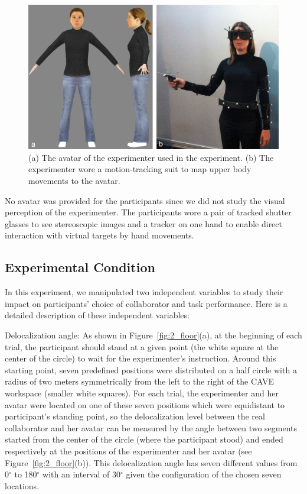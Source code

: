 \begin{figure}[tb]
  \centering
  \includegraphics[width=\textwidth]{figures/2_avatar_photo}
  \caption{\label{fig:2_avatar}(a) The avatar of the experimenter used in the experiment. (b) The experimenter wore a motion-tracking suit to map upper body movements to the avatar.}
\end{figure}

No avatar was provided for the participants since we did not study the visual perception of the experimenter. The participants wore a pair of tracked shutter glasses to see stereoscopic images and a tracker on one hand to enable direct interaction with virtual targets by hand movements.

\subsection{Experimental Condition}
In this experiment, we manipulated two independent variables to study their impact on participants' choice of collaborator and task performance. Here is a detailed description of these independent variables:

Delocalization angle: As shown in Figure~\ref{fig:2_floor}(a), at the beginning of each trial, the participant should stand at a given point (the white square at the center of the circle) to wait for the experimenter's instruction. Around this starting point, seven predefined positions were distributed on a half circle with a radius of two meters symmetrically from the left to the right of the CAVE workspace (smaller white squares). For each trial, the experimenter and her avatar were located on one of these seven positions which were equidistant to participant's standing point, so the delocalization level between the real collaborator and her avatar can be measured by the angle between two segments started from the center of the circle (where the participant stood) and ended respectively at the positions of the experimenter and her avatar (see Figure~\ref{fig:2_floor}(b)). This delocalization angle has seven different values from 0$^\circ$ to 180$^\circ$ with an interval of 30$^\circ$ given the configuration of the chosen seven locations.

